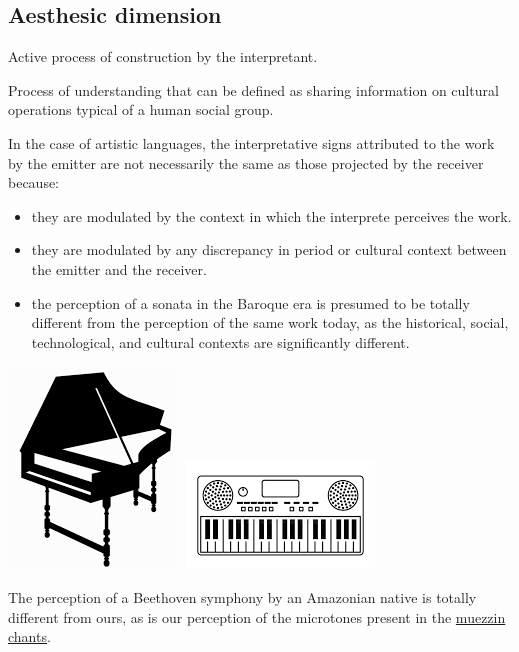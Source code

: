 \subsection{Aesthesic dimension}\label{aesthesic-dimension}

Active process of construction by the interpretant.

Process of understanding that can be defined as sharing information on cultural operations typical of a human social group.

In the case of artistic languages, the interpretative signs attributed to the work by the emitter are not necessarily the same as those projected by the receiver because:

\begin{itemize}
\tightlist
\item they are modulated by the context in which the interprete perceives the work.
\item they are modulated by any discrepancy in period or cultural context between the emitter and the receiver.
\item the perception of a sonata in the Baroque era is presumed to be totally different from the perception of the same work today, as the historical, social, technological, and cultural contexts are significantly different.
\end{itemize}

\begin{center}
\includegraphics[scale=0.45]{../img/barocca.png}
\includegraphics[scale=0.65]{../img/moderna.png}
\end{center}

The perception of a Beethoven symphony by an Amazonian native is totally different from ours, as is our perception of the microtones present in the \href{http://www.musicaecodice.it/gitmedia/emc/1_media/muezzin.mp3}{muezzin chants}.

